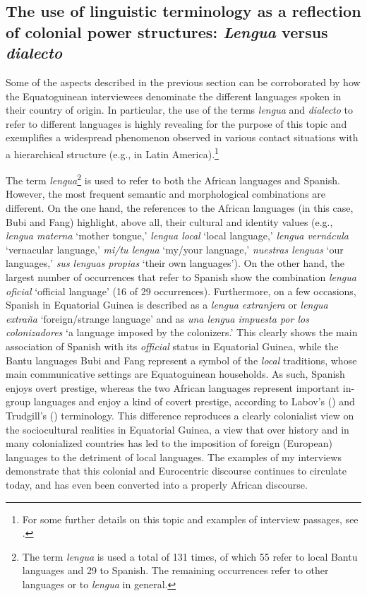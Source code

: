 \documentclass[output=paper]{langscibook}
\begin{document}
\subsection{The use of linguistic terminology as a reflection of colonial power structures: \textit{Lengua} versus \textit{dialecto}}
\label{schlumpf:sec:terminology}

Some of the aspects described in the previous section can be corroborated by how the Equatoguinean interviewees denominate the different languages spoken in their country of origin. In particular, the use of the terms \textit{lengua} and \textit{dialecto} to refer to different languages is highly revealing for the purpose of this topic and exemplifies a widespread phenomenon observed in various contact situations with a hierarchical structure (e.g., in Latin America).\footnote{  	For some further details on this topic and examples of interview passages, see \citet{schlumpf_castizar_2021}.}

The term \textit{lengua}\footnote{The term \textit{lengua} is used a total of 131 times, of which 55 refer to local Bantu languages and 29 to Spanish. The remaining occurrences refer to other languages or to \textit{lengua} in general.} is used to refer to both the African languages and Spanish. However, the most frequent semantic and morphological combinations are different. On the one hand, the references to the African languages (in this case, Bubi and Fang) highlight, above all, their cultural and identity values (e.g., \textit{lengua materna} ‘mother tongue,’ \textit{lengua local} ‘local language,’ \textit{lengua vernácula} ‘vernacular language,’ \textit{mi/tu lengua} ‘my/your language,’ \textit{nuestras lenguas} ‘our languages,’ \textit{sus lenguas propias} ‘their own languages’). On the other hand, the largest number of occurrences that refer to Spanish show the combination \textit{lengua oficial} ‘official language’ (16 of 29 occurrences). Furthermore, on a few occasions, Spanish in Equatorial Guinea is described as a \textit{lengua extranjera} or \textit{lengua extraña} ‘foreign/strange language’ and as \textit{una lengua impuesta por los colonizadores} ‘a language imposed by the colonizers.’ This clearly shows the main association of Spanish with its \textit{official} status in Equatorial Guinea, while the Bantu languages Bubi and Fang represent a symbol of the \textit{local} traditions, whose main communicative settings are Equatoguinean households. As such, Spanish enjoys overt prestige, whereas the two African languages represent important in-group languages and enjoy a kind of covert prestige, according to Labov’s (\citeyear{labov_social_2006}) and Trudgill’s (\citeyear{trudgill_sex_1972}) terminology. This difference reproduces a clearly colonialist view on the sociocultural realities in Equatorial Guinea, a view that over history and in many colonialized countries has led to the imposition of foreign (European) languages to the detriment of local languages. The examples of my interviews demonstrate that this colonial and Eurocentric discourse continues to circulate today, and has even been converted into a properly African discourse.
\end{document}
